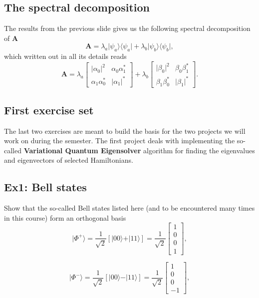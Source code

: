 \subsection{The spectral decomposition}
The results from the previous slide gives us
the following spectral decomposition of $\bm{A}$
\[
\bm{A}=\lambda_a \vert \psi_a\rangle \langle \psi_a\vert+\lambda_b \vert \psi_b\rangle \langle \psi_b\vert,
\]
which written out in all its details reads
\[
\bm{A}=\lambda_a\begin{bmatrix} \vert \alpha_0\vert^2 &\alpha_0\alpha_1^* \\
                                                                   \alpha_1\alpha_0^* & \vert \alpha_1\vert^* \end{bmatrix} +\lambda_b\begin{bmatrix} \vert \beta_0\vert^2 &\beta_0\beta_1^* \\
                                                                   \beta_1\beta_0^* & \vert \beta_1\vert^* \end{bmatrix}.
\]

\subsection{First exercise set}

The last two exercises are meant to build the basis for
the two projects we will work on during the semester.  The first
project deals with implementing the so-called
\textbf{Variational Quantum Eigensolver} algorithm for finding the eigenvalues and eigenvectors of selected Hamiltonians.

\subsection{Ex1: Bell states}

Show that the so-called Bell states listed here (and to be encountered many times in this course) form an orthogonal basis
\[
\vert \Phi^+\rangle = \frac{1}{\sqrt{2}}\left[\vert 00\rangle +\vert 11\rangle\right]=\frac{1}{\sqrt{2}}\begin{bmatrix} 1 \\ 0 \\ 0 \\ 1\end{bmatrix},
\]

\[
\vert \Phi^-\rangle = \frac{1}{\sqrt{2}}\left[\vert 00\rangle -\vert 11\rangle\right]=\frac{1}{\sqrt{2}}\begin{bmatrix} 1 \\ 0 \\ 0 \\ -1\end{bmatrix},
\]

